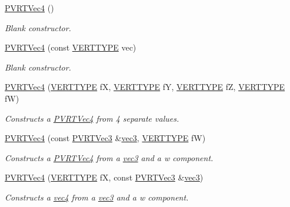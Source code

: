 \begin{DoxyCompactItemize}
\item 
\hyperlink{struct_p_v_r_t_vec4_a597964659df1d88223f278a4fd59de40}{P\+V\+R\+T\+Vec4} ()
\begin{DoxyCompactList}\small\item\em Blank constructor. \end{DoxyCompactList}\item 
\hyperlink{struct_p_v_r_t_vec4_a272c5c70974d0626aa190eb694b8d78f}{P\+V\+R\+T\+Vec4} (const \hyperlink{group___a_p_i___o_g_l_e_s_ga06da457b7d3e93368ab904f89e1396be}{V\+E\+R\+T\+T\+Y\+P\+E} vec)
\begin{DoxyCompactList}\small\item\em Blank constructor. \end{DoxyCompactList}\item 
\hyperlink{struct_p_v_r_t_vec4_ad2f7ccbe83f931b8e31356dfb22b478e}{P\+V\+R\+T\+Vec4} (\hyperlink{group___a_p_i___o_g_l_e_s_ga06da457b7d3e93368ab904f89e1396be}{V\+E\+R\+T\+T\+Y\+P\+E} f\+X, \hyperlink{group___a_p_i___o_g_l_e_s_ga06da457b7d3e93368ab904f89e1396be}{V\+E\+R\+T\+T\+Y\+P\+E} f\+Y, \hyperlink{group___a_p_i___o_g_l_e_s_ga06da457b7d3e93368ab904f89e1396be}{V\+E\+R\+T\+T\+Y\+P\+E} f\+Z, \hyperlink{group___a_p_i___o_g_l_e_s_ga06da457b7d3e93368ab904f89e1396be}{V\+E\+R\+T\+T\+Y\+P\+E} f\+W)
\begin{DoxyCompactList}\small\item\em Constructs a \hyperlink{struct_p_v_r_t_vec4}{P\+V\+R\+T\+Vec4} from 4 separate values. \end{DoxyCompactList}\item 
\hyperlink{struct_p_v_r_t_vec4_aa2b423e71f4746882b77ffbbcf300eb5}{P\+V\+R\+T\+Vec4} (const \hyperlink{struct_p_v_r_t_vec3}{P\+V\+R\+T\+Vec3} \&\hyperlink{classvec3}{vec3}, \hyperlink{group___a_p_i___o_g_l_e_s_ga06da457b7d3e93368ab904f89e1396be}{V\+E\+R\+T\+T\+Y\+P\+E} f\+W)
\begin{DoxyCompactList}\small\item\em Constructs a \hyperlink{struct_p_v_r_t_vec4}{P\+V\+R\+T\+Vec4} from a \hyperlink{classvec3}{vec3} and a w component. \end{DoxyCompactList}\item 
\hyperlink{struct_p_v_r_t_vec4_ae8a645a41b3148e383b2be93d122e939}{P\+V\+R\+T\+Vec4} (\hyperlink{group___a_p_i___o_g_l_e_s_ga06da457b7d3e93368ab904f89e1396be}{V\+E\+R\+T\+T\+Y\+P\+E} f\+X, const \hyperlink{struct_p_v_r_t_vec3}{P\+V\+R\+T\+Vec3} \&\hyperlink{classvec3}{vec3})
\begin{DoxyCompactList}\small\item\em Constructs a \hyperlink{classvec4}{vec4} from a \hyperlink{classvec3}{vec3} and a w component. \end{DoxyCompactList}\item 

\end{DoxyCompactItemize}
